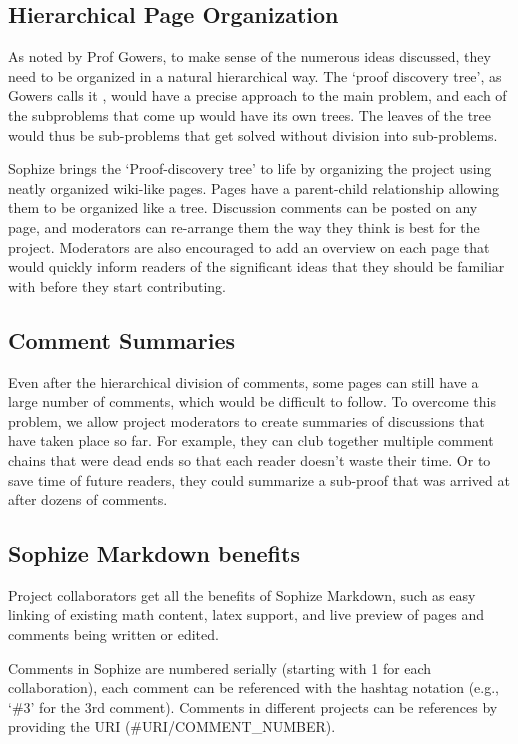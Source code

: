 \documentclass[a4paper]{article}
\begin{document}
\subsection{Hierarchical Page Organization}

As noted by Prof Gowers, to make sense of the numerous ideas discussed, they need to be organized in a natural hierarchical way. The `proof discovery tree', as Gowers calls it \cite{gowers_weblog_2009}, would have a precise approach to the main problem, and each of the subproblems that come up would have its own trees. The leaves of the tree would thus be sub-problems that get solved without division into sub-problems.


Sophize brings the `Proof-discovery tree' to life by organizing the project using neatly organized wiki-like pages. Pages have a parent-child relationship allowing them to be organized like a tree. Discussion comments can be posted on any page, and moderators can re-arrange them the way they think is best for the project. Moderators are also encouraged to add an overview on each page that would quickly inform readers of the significant ideas that they should be familiar with before they start contributing.


\subsection{Comment Summaries}

Even after the hierarchical division of comments, some pages can still have a large number of comments, which would be difficult to follow. To overcome this problem, we allow project moderators to create summaries of discussions that have taken place so far. For example, they can club together multiple comment chains that were dead ends so that each reader doesn't waste their time. Or to save time of future readers, they could summarize a sub-proof that was arrived at after dozens of comments.


\subsection{Sophize Markdown benefits}

Project collaborators get all the benefits of Sophize Markdown, such as easy linking of existing math content, latex support, and live preview of pages and comments being written or edited.


Comments in Sophize are numbered serially (starting with 1 for each collaboration), each comment can be referenced with the hashtag notation (e.g., `\#3' for the 3rd comment). Comments in different projects can be references by providing the URI (\#URI/COMMENT\_NUMBER).
\end{document}
